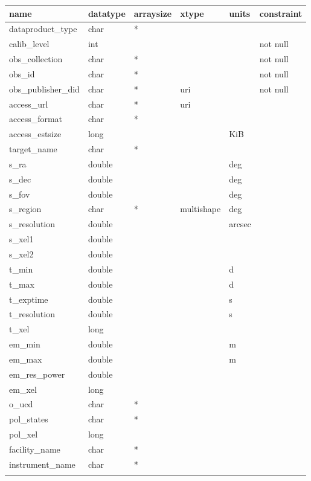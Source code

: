 \documentclass[11pt,a4paper]{ivoa}
\begin{document}
\begin{tabularx}{\textwidth}{|p{}|p{}|p{}|p{}|p{}|p{}|}
\hline
name & datatype & arraysize & xtype & units & constraint\\\hline
dataproduct\_type & char & * & & & \\\hline
calib\_level & int & & & & not null\\\hline
obs\_collection & char & * & & & not null\\\hline
obs\_id & char & * & & & not null\\\hline
obs\_publisher\_did & char & * & uri & & not null\\\hline
access\_url & char & * & uri & & \\\hline
access\_format & char & * & & & \\\hline
access\_estsize & long & & & KiB & \\\hline
target\_name & char & * & & & \\\hline
s\_ra & double & & & deg & \\\hline
s\_dec & double & & & deg  & \\\hline
s\_fov & double & & & deg  & \\\hline
s\_region & char & * & multishape & deg & \\\hline
s\_resolution & double & & & arcsec  & \\\hline
s\_xel1 & double & & & & \\\hline
s\_xel2 & double & & & & \\\hline
t\_min & double & & & d & \\\hline
t\_max & double & & & d & \\\hline
t\_exptime & double & & & s & \\\hline
t\_resolution & double & & & s & \\\hline
t\_xel & long & & & & \\\hline
em\_min & double & & & m & \\\hline
em\_max & double & & & m & \\\hline
em\_res\_power & double & & & & \\\hline
em\_xel & long & & & & \\\hline
o\_ucd & char & * & & & \\\hline
pol\_states  & char & * & & & \\\hline
pol\_xel & long & & & & \\\hline
facility\_name & char & * & & & \\\hline
instrument\_name & char & * & & & \\\hline
\caption{ObsCore: metadata for required fields}
\label{tab:OCR}
\end{tabularx}
\end{document}
